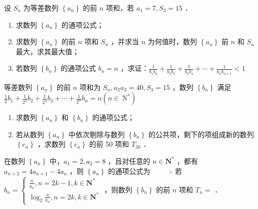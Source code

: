 \begin{example}
    设 $S_n$ 为等差数列 $\left\{a_n\right\}$ 的前 $n$ 项和，若 $a_1=7, S_3=15$ ．
    \begin{enumerate}
        \item 求数列 $\left\{a_n\right\}$ 的通项公式；

        \item 求数列 $\left\{a_n\right\}$ 的前 $n$ 项和 $S_n$ ，并求当 $n$ 为何值时，数列 $\left\{a_n\right\}$ 前 $n$ 和 $S_n$ 最大，求其最大值；

        \item 若数列 $\left\{b_n\right\}$ 的通项公式 $b_n=n$ ，求证：$\frac{1}{b_1 b_2}+\frac{1}{b_2 b_3}+\frac{1}{b_3 b_4}+\cdots+\frac{1}{b_n b_{n+1}}<1$
    \end{enumerate}
\end{example}

\vspace{10em}

\begin{example}
    等差数列 $\left\{a_n\right\}$ 的前 $n$ 项和为 $S_n, a_2 a_3=40, S_3=15$ ，数列 $\left\{b_n\right\}$ 满足 $\frac{1}{2} b_1+\frac{1}{2^2} b_2+\frac{1}{2^3} b_3+\cdots+\frac{1}{2^n} b_n=n\left(n \in \mathrm{~N}^*\right)$
    \begin{enumerate}
        \item 求数列 $\left\{a_n\right\}$ 和 $\left\{b_n\right\}$ 的通项公式；

        \item 若从数列 $\left\{a_n\right\}$ 中依次剔除与数列 $\left\{b_n\right\}$ 的公共项，剩下的项组成新的数列 $\left\{c_n\right\}$ ，求数列 $\left\{c_n\right\}$ 的前 50 项和 $T_{50}$ ．
    \end{enumerate}
\end{example}

\vspace{10em}

\begin{example}
    在数列 $\left\{a_n\right\}$ 中，$a_1=2, a_2=8$ ，且对任意的 $n \in \mathbf{N}^*$ ，都有 $a_{n+2}=4 a_{n+1}-4 a_n$ ，则 $\left\{a_n\right\}$ 的通项公式为 $\qquad$ $\therefore$ 若 $b_n=\left\{\begin{array}{l}\frac{n}{a_n}, n=2 k-1, k \in \mathbf{N}^* \\ \log _2 \frac{n}{a_n}, n=2 k, k \in \mathbf{N}^*\end{array}\right.$ ，则数列 $\left\{b_n\right\}$ 的前 $n$ 项和 $T_n=$ \underline{\qquad}．
\end{example}

\vspace{10em}

